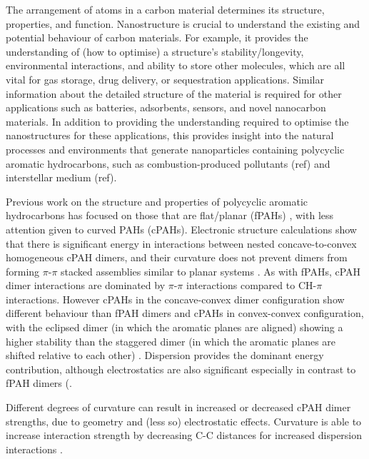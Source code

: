The arrangement of atoms in a carbon material determines its structure, properties, and function. Nanostructure is crucial to understand the existing and potential behaviour of carbon materials. For example, it provides the understanding of (how to optimise) a structure's stability/longevity, environmental interactions, and ability to store other molecules, which are all vital for gas storage, drug delivery, or sequestration applications.  Similar information about the detailed structure of the material is required for other applications such as batteries, adsorbents, sensors, and novel nanocarbon materials.
In addition to providing the understanding required to optimise the nanostructures for these applications, this provides insight into the natural processes and environments that generate nanoparticles containing polycyclic aromatic hydrocarbons, such as combustion-produced pollutants (ref) and interstellar medium (ref).

Previous work on the structure and properties of polycyclic aromatic hydrocarbons has focused on those that are flat/planar (fPAHs) \cite{Grancic2016,chen2014size,Rapacioli2005stacked,hernandez2017dynamics}, with less attention given to curved PAHs (cPAHs). Electronic structure calculations show that there is significant energy in interactions between nested concave-to-convex homogeneous cPAH dimers, and their curvature does not prevent dimers from forming $\pi$-$\pi$ stacked assemblies similar to planar systems \cite{sygula2009pi,Cabaleiro-Lago2018}. As with fPAHs, cPAH dimer interactions are dominated by $\pi$-$\pi$ interactions compared to CH-$\pi$ interactions. However cPAHs in the concave-convex dimer configuration show different behaviour than fPAH dimers and cPAHs in convex-convex configuration, with the eclipsed dimer (in which the aromatic planes are aligned) showing a higher stability than the staggered dimer (in which the aromatic planes are shifted relative to each other) \cite{janowski2011convex,Cabaleiro-Lago2018}.
Dispersion provides the dominant energy contribution, although electrostatics are also significant especially in contrast to fPAH dimers (\cite{Cabaleiro-Lago2018,janowski2011convex}.

Different degrees of curvature can result in increased or decreased cPAH dimer strengths, due to geometry and (less so) electrostatic effects. Curvature is able to increase interaction strength by decreasing C-C distances for increased dispersion interactions \cite{kennedy2012buckyplates}. 

